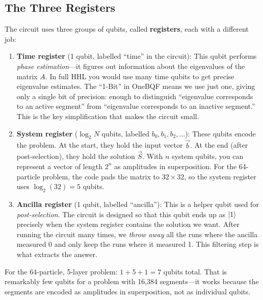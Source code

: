 \documentclass[11pt, a4paper]{article}
\begin{document}
\subsection{The Three Registers}

The circuit uses three groups of qubits, called \textbf{registers}, each
with a different job:

\begin{enumerate}
    \item \textbf{Time register} (1 qubit, labelled ``time'' in the
          circuit): This qubit performs \emph{phase estimation}---it
          figures out information about the eigenvalues of the matrix $A$.
          In full HHL you would use many time qubits to get precise
          eigenvalue estimates. The ``1-Bit'' in OneBQF means we use just
          one, giving only a single bit of precision: enough to distinguish
          ``eigenvalue corresponds to an active segment'' from ``eigenvalue
          corresponds to an inactive segment.'' This is the key
          simplification that makes the circuit small.

    \item \textbf{System register} ($\log_2 N$ qubits, labelled $b_0,
          b_1, b_2, \ldots$): These qubits encode the problem. At the
          start, they hold the input vector $\vec{b}$. At the end (after
          post-selection), they hold the solution $\vec{S}$. With $n$
          system qubits, you can represent a vector of length $2^n$ as
          amplitudes in superposition. For the 64-particle problem, the
          code pads the matrix to $32 \times 32$, so the system register
          uses $\log_2(32) = 5$ qubits.

    \item \textbf{Ancilla register} (1 qubit, labelled ``ancilla''): This
          is a helper qubit used for \emph{post-selection}. The circuit is
          designed so that this qubit ends up as $\ket{1}$ precisely when
          the system register contains the solution we want. After running
          the circuit many times, we \emph{throw away} all the runs where
          the ancilla measured 0 and only keep the runs where it measured
          1. This filtering step is what extracts the answer.
\end{enumerate}

For the 64-particle, 5-layer problem: $1 + 5 + 1 = 7$ qubits total.
That is remarkably few qubits for a problem with 16,384 segments---it
works because the segments are encoded as amplitudes in superposition,
not as individual qubits.
\end{document}
